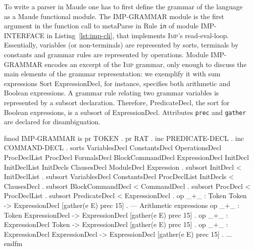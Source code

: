 \documentclass[a4paper,openany]{book}
\begin{document}
To write a parser in Maude one has to first define the grammar of the language as a Maude functional module. The IMP-GRAMMAR module 
is the first argument in the function call to metaParse in Rule \texttt{in} of module IMP-INTERFACE in Listing~\ref{lst:imp-cli}, that implements \textsc{Imp}'s read-eval-loop. Essentially, variables (or non-terminals) are represented by sorts, terminals by constants and grammar rules are represented by operations. 
Module IMP-GRAMMAR encodes an excerpt of the \textsc{Imp} grammar, only enough to discuss the main elements of the grammar representation: we exemplify it with sum expressions
Sort ExpressionDecl, for instance, specifies both arithmetic and Boolean expressions. A grammar rule relating two grammar variables is represented by a subsort declaration. Therefore, PredicateDecl, the sort for Boolean expressions, is a subsort of ExpressionDecl.  Attributes \texttt{prec} and \texttt{gather} are declared for disambiguation. 
\begin{maude}
fmod IMP-GRAMMAR is pr TOKEN . pr RAT .
 inc PREDICATE-DECL . inc COMMAND-DECL .
 sorts VariablesDecl ConstantsDecl OperationsDecl ProcDeclList
       ProcDecl FormalsDecl BlockCommandDecl ExpressionDecl
       InitDecl InitDeclList InitDecls ClausesDecl
       ModuleDecl Expression .
 subsort InitDecl < InitDeclList .
 subsort VariablesDecl ConstantsDecl ProcDeclList InitDecls < ClausesDecl .
 subsort BlockCommandDecl < CommandDecl .
 subsort ProcDecl < ProcDeclList .
 subsort PredicateDecl < ExpressionDecl .
 op _+_ : Token Token -> ExpressionDecl [gather(e E) prec 15] . --- Arithmetic expressions
 op _+_ : Token ExpressionDecl -> ExpressionDecl [gather(e E) prec 15] .
 op _+_ : ExpressionDecl Token -> ExpressionDecl [gather(e E) prec 15] .
 op _+_ : ExpressionDecl ExpressionDecl -> ExpressionDecl [gather(e E) prec 15] .
$\ldots$
endfm
\end{maude}
% 
\end{document}
